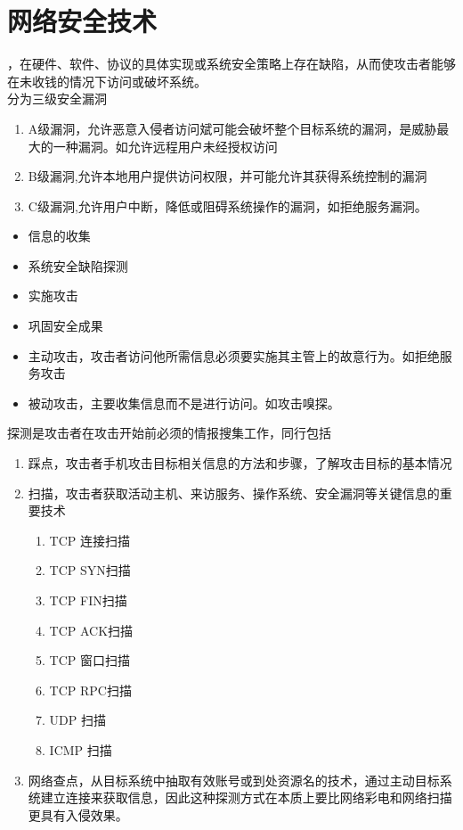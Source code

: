 \chapter{网络安全技术}
，在硬件、软件、协议的具体实现或系统安全策略上存在缺陷，从而使攻击者能够在未收钱的情况下访问或破坏系统。\\
分为三级安全漏洞
\begin{enumerate}
	\item A级漏洞，允许恶意入侵者访问斌可能会破坏整个目标系统的漏洞，是威胁最大的一种漏洞。如允许远程用户未经授权访问
	\item B级漏洞,允许本地用户提供访问权限，并可能允许其获得系统控制的漏洞
	\item C级漏洞,允许用户中断，降低或阻碍系统操作的漏洞，如拒绝服务漏洞。
\end{enumerate}


\begin{itemize}
	\item 信息的收集
	\item 系统安全缺陷探测
	\item 实施攻击
	\item 巩固安全成果
\end{itemize}

\begin{itemize}
	\item 主动攻击，攻击者访问他所需信息必须要实施其主管上的故意行为。如拒绝服务攻击
	\item 被动攻击，主要收集信息而不是进行访问。如攻击嗅探。
\end{itemize}




探测是攻击者在攻击开始前必须的情报搜集工作，同行包括
\begin{enumerate}
	\item 踩点，攻击者手机攻击目标相关信息的方法和步骤，了解攻击目标的基本情况
	\item 扫描，攻击者获取活动主机、来访服务、操作系统、安全漏洞等关键信息的重要技术
	\begin{enumerate}
		\item TCP 连接扫描
		\item TCP SYN扫描
		\item TCP FIN扫描
		\item TCP ACK扫描
		\item TCP 窗口扫描
		\item TCP RPC扫描
		\item UDP 扫描
		\item ICMP 扫描
	\end{enumerate}
	\item 网络查点，从目标系统中抽取有效账号或到处资源名的技术，通过主动目标系统建立连接来获取信息，因此这种探测方式在本质上要比网络彩电和网络扫描更具有入侵效果。
\end{enumerate}


